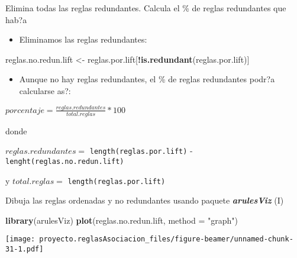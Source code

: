 \documentclass[
  ignorenonframetext,
]{beamer}
\newenvironment{Shaded}{\begin{snugshade}}{\end{snugshade}}
\newcommand{\DataTypeTok}[1]{\textcolor[rgb]{0.13,0.29,0.53}{#1}}
\newcommand{\KeywordTok}[1]{\textcolor[rgb]{0.13,0.29,0.53}{\textbf{#1}}}
\newcommand{\NormalTok}[1]{#1}
\newcommand{\OperatorTok}[1]{\textcolor[rgb]{0.81,0.36,0.00}{\textbf{#1}}}
\newcommand{\StringTok}[1]{\textcolor[rgb]{0.31,0.60,0.02}{#1}}
\providecommand{\tightlist}{%
  \setlength{\itemsep}{0pt}\setlength{\parskip}{0pt}}
\begin{document}
\begin{frame}[fragile]{Elimina todas las reglas redundantes. Calcula el
\% de reglas redundantes que hab?a}
\protect\hypertarget{elimina-todas-las-reglas-redundantes.-calcula-el-de-reglas-redundantes-que-haba}{}

\begin{itemize}
\tightlist
\item
  Eliminamos las reglas redundantes:
\end{itemize}

\begin{Shaded}
\begin{Highlighting}[]
\NormalTok{reglas.no.redun.lift <-}\StringTok{ }\NormalTok{reglas.por.lift[}\OperatorTok{!}\KeywordTok{is.redundant}\NormalTok{(reglas.por.lift)]}
\end{Highlighting}
\end{Shaded}

\begin{itemize}
\tightlist
\item
  Aunque no hay reglas redundantes, el \% de reglas redundantes podr?a
  calcularse as?:
\end{itemize}

\(porcentaje = \frac{reglas.redundantes}{total.reglas} * 100\)

donde

\(reglas.redundantes =\) \texttt{length(reglas.por.lift)} -
\texttt{lenght(reglas.no.redun.lift)}

y \(total.reglas =\) \texttt{length(reglas.por.lift)}

\end{frame}

\begin{frame}[fragile]{Dibuja las reglas ordenadas y no redundantes
usando paquete \textbf{\emph{arulesViz}} (I)}
\protect\hypertarget{dibuja-las-reglas-ordenadas-y-no-redundantes-usando-paquete-arulesviz-i}{}

\begin{Shaded}
\begin{Highlighting}[]
\KeywordTok{library}\NormalTok{(arulesViz)}
\KeywordTok{plot}\NormalTok{(reglas.no.redun.lift, }\DataTypeTok{method =} \StringTok{"graph"}\NormalTok{)}
\end{Highlighting}
\end{Shaded}

\texttt{[image: proyecto.reglasAsociacion\_files/figure-beamer/unnamed-chunk-31-1.pdf]}

\end{frame}
\end{document}
